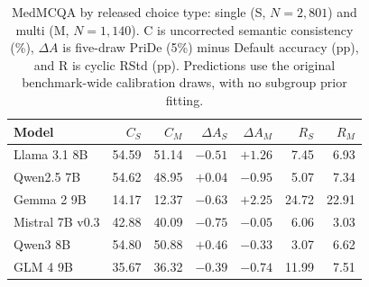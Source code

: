 \begin{table}[htbp]
\centering\small\setlength{\tabcolsep}{4pt}
\caption{MedMCQA by released choice type: single (S, $N=2,801$) and multi (M, $N=1,140$). C is uncorrected semantic consistency (\%), $\Delta A$ is five-draw PriDe (5\%) minus Default accuracy (pp), and R is cyclic RStd (pp). Predictions use the original benchmark-wide calibration draws, with no subgroup prior fitting.}
\label{tab:medmcqa-choice-type}
\begin{tabular}{lrrrrrr}
\toprule
Model & $C_S$ & $C_M$ & $\Delta A_S$ & $\Delta A_M$ & $R_S$ & $R_M$\\
\midrule
Llama 3.1 8B & 54.59 & 51.14 & $-0.51$ & $+1.26$ & 7.45 & 6.93\\
Qwen2.5 7B & 54.62 & 48.95 & $+0.04$ & $-0.95$ & 5.07 & 7.34\\
Gemma 2 9B & 14.17 & 12.37 & $-0.63$ & $+2.25$ & 24.72 & 22.91\\
Mistral 7B v0.3 & 42.88 & 40.09 & $-0.75$ & $-0.05$ & 6.06 & 3.03\\
Qwen3 8B & 54.80 & 50.88 & $+0.46$ & $-0.33$ & 3.07 & 6.62\\
GLM 4 9B & 35.67 & 36.32 & $-0.39$ & $-0.74$ & 11.99 & 7.51\\
\bottomrule
\end{tabular}
\end{table}
